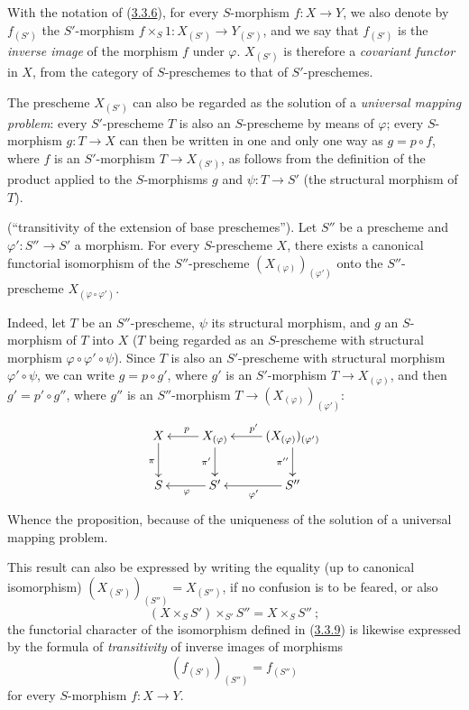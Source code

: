 \begin{env}[3.3.7]
\label{I.3.3.7}
With the notation of (\hyperref[I.3.3.6]{3.3.6}), for every
$S$-morphism $f:X\to Y$, we also denote by $f_{(S')}$ the $S'$-morphism
$f\times_S 1:X_{(S')}\to Y_{(S')}$, and we say that $f_{(S')}$ is
the \emph{inverse image} of the morphism $f$ under $\varphi$. $X_{(S')}$ is
therefore a \emph{covariant functor} in $X$, from the category of
$S$-preschemes to that of $S'$-preschemes.
\end{env}

\begin{env}[3.3.8]
\label{I.3.3.8}
The prescheme $X_{(S')}$ can also be regarded as the solution of a
\emph{universal mapping problem}: every $S'$-prescheme $T$ is also
an $S$-prescheme by means of $\varphi$; every $S$-morphism $g:T\to X$
can then be written in one and only one way as $g=p\circ f$, where $f$ is an
$S'$-morphism $T\to X_{(S')}$, as follows from the definition of the product
applied to the $S$-morphisms $g$ and $\psi:T\to S'$ (the structural morphism
of $T$).
\end{env}

\begin{proposition}[3.3.9]
\label{I.3.3.9}
\textup{(``transitivity of the extension of base preschemes'').} Let
$S''$ be a prescheme and $\varphi':S''\to S'$ a morphism. For every
$S$-prescheme $X$, there exists a canonical functorial isomorphism of the
$S''$-prescheme $(X_{(\varphi)})_{(\varphi')}$ onto the $S''$-prescheme
$X_{(\varphi\circ\varphi')}$.
\end{proposition}

Indeed, let $T$ be an $S''$-prescheme, $\psi$ its structural morphism, and
$g$ an $S$-morphism of $T$ into $X$ ($T$ being regarded as an
$S$-prescheme with structural morphism $\varphi\circ\varphi'\circ\psi$).
Since $T$ is also an $S'$-prescheme with structural morphism
$\varphi'\circ\psi$, we can write $g=p\circ g'$, where $g'$ is an
$S'$-morphism $T\to X_{(\varphi)}$, and then $g'=p'\circ g''$, where $g''$ is
an $S''$-morphism $T\to(X_{(\varphi)})_{(\varphi')}$:
\label{I.3.3.9.transitivity-diagram}
\[
  \xymatrix{
    X\ar[d]_{\pi} &
    X_{(\varphi)}\ar[l]_{p}\ar[d]_{\pi'} &
    (X_{(\varphi)})_{(\varphi')}\ar[l]_{p'}\ar[d]_{\pi''}\\
    S & S'\ar[l]^{\varphi} & S''\ar[l]^{\varphi'}
  }
\]
Whence the proposition, because of the uniqueness of the solution of a
universal mapping problem.

This result can also be expressed by writing the equality (up to canonical
isomorphism) $(X_{(S')})_{(S'')}=X_{(S'')}$, if no confusion is to be
feared, or also
\begin{equation}
  (X\times_S S')\times_{S'}S''=X\times_S S''~;
  \tag{3.3.9.1}\label{I.3.3.9.1}
\end{equation}
the functorial character of the isomorphism defined in
(\hyperref[I.3.3.9]{3.3.9}) is likewise expressed by the formula of
\emph{transitivity} of inverse images of morphisms
\begin{equation}
  (f_{(S')})_{(S'')}=f_{(S'')}
  \tag{3.3.9.2}\label{I.3.3.9.2}
\end{equation}
for every $S$-morphism $f:X\to Y$.

